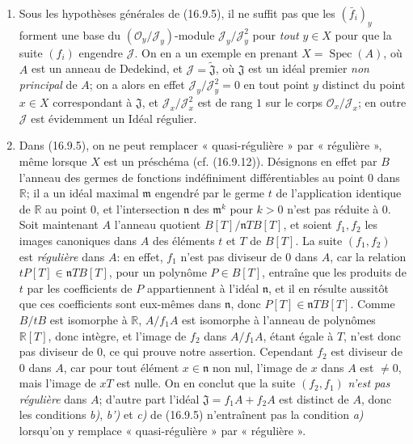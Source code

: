 \begin{remarks}[16.9.6]
\label{IV.16.9.6}
\begin{enumerate}
  \item[(i)] Sous les hypothèses générales de (16.9.5), il ne suffit pas que
  les $(\bar f_i)_y$ forment une base du
  $(\mathcal{O}_y/\mathscr{J}_y)$-module
  $\mathscr{J}_y/\mathscr{J}_y^2$ pour \emph{tout} $y\in X$ pour que la suite
  $(f_i)$ engendre $\mathscr{J}$. On en a un exemple en
  prenant $X=\operatorname{Spec}(A)$, où $A$ est un anneau de Dedekind, et
  $\mathscr{J}=\widetilde{\mathfrak{J}}$, où $\mathfrak{J}$ est un idéal
  premier \emph{non principal} de $A$; on a alors en effet
  $\mathscr{J}_y/\mathscr{J}_y^2=0$ en tout point $y$ distinct du point
  $x\in X$ correspondant à $\mathfrak{J}$, et
  $\mathscr{J}_x/\mathscr{J}_x^2$ est de rang $1$ sur le corps
  $\mathcal{O}_x/\mathscr{J}_x$; en outre $\mathscr{J}$ est évidemment un
  Idéal régulier.
  \item[(ii)] Dans (16.9.5), on ne peut remplacer « quasi-régulière » par
  « régulière », même lorsque $X$ est un préschéma (cf. (16.9.12)).
  Désignons en effet par $B$ l'anneau des germes de fonctions indéfiniment
  différentiables au point $0$ dans $\mathbb{R}$; il a un idéal maximal
  $\mathfrak{m}$ engendré par le germe $t$ de l'application identique de
  $\mathbb{R}$ au point $0$, et l'intersection $\mathfrak{n}$ des
  $\mathfrak{m}^k$ pour $k>0$ n'est pas réduite à $0$. Soit maintenant $A$
  l'anneau quotient $B[T]/\mathfrak{n}TB[T]$, et soient $f_1,f_2$ les images
  canoniques dans $A$ des éléments $t$ et $T$ de $B[T]$. La suite
  $(f_1,f_2)$ est \emph{régulière} dans $A$: en effet, $f_1$ n'est pas diviseur de
  $0$ dans $A$, car la relation $tP[T]\in\mathfrak{n}TB[T]$, pour un
  polynôme $P\in B[T]$, entraîne que les produits de $t$ par les coefficients
  de $P$ appartiennent à l'idéal $\mathfrak{n}$, et il en résulte aussitôt que
  ces coefficients sont eux-mêmes dans $\mathfrak{n}$, donc
  $P[T]\in\mathfrak{n}TB[T]$. Comme $B/tB$ est isomorphe à $\mathbb{R}$,
  $A/f_1A$ est isomorphe à l'anneau de polynômes $\mathbb{R}[T]$, donc
  intègre, et l'image de $f_2$ dans $A/f_1A$, étant égale à $T$, n'est donc
  pas diviseur de $0$, ce qui prouve notre assertion. Cependant $f_2$ est
  diviseur de $0$ dans $A$, car pour tout élément $x\in\mathfrak{n}$ non nul,
  l'image de $x$ dans $A$ est $\ne0$, mais l'image de $xT$ est nulle. On en
  conclut que la suite $(f_2,f_1)$ \emph{n'est pas régulière} dans $A$; d'autre part
  l'idéal $\mathfrak{J}=f_1A+f_2A$ est distinct de $A$, donc les conditions
  \emph{b)}, \emph{b')} et \emph{c)} de (16.9.5) n'entraînent pas la condition \emph{a)} lorsqu'on y
  remplace « quasi-régulière » par « régulière ».
\end{enumerate}
\end{remarks}

